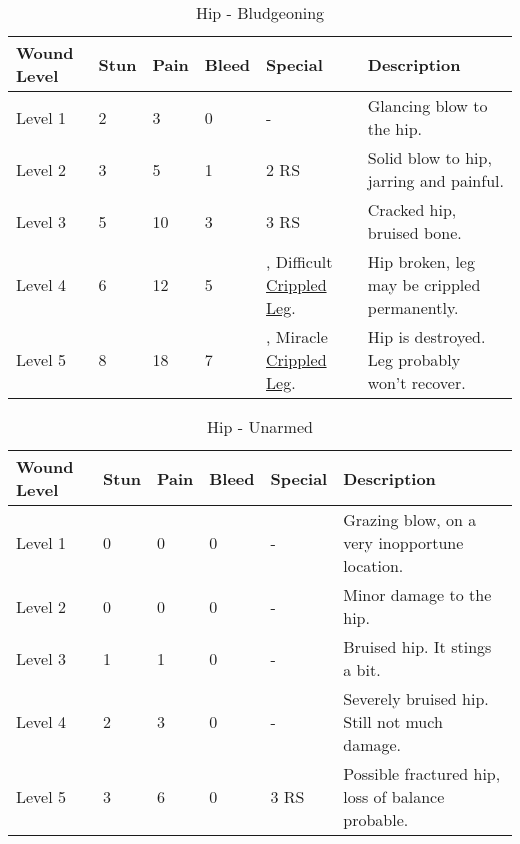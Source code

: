 \documentclass[oneside,11pt,english]{book}
\begin{document}
\begin{table}[hb] %
	\caption{Hip - Bludgeoning}
	\label{wound:Hip - Bludgeoning}
	\begin{tabu} to 
Wound Level &Stun &Pain &Bleed &Special &Description\\\toprule
Level 1& 2& 3& 0& - &Glancing blow to the hip.\\
Level 2& 3& 5& 1&  2 RS &Solid blow to hip, jarring and painful.\\
Level 3& 5& 10& 3&  3 RS &Cracked hip, bruised bone.\\
Level 4& 6& 12& 5
	&, \newline
		Difficult~ \hyperref[bane:Crippled Limb/Appendage]{Crippled Leg}.
	&Hip broken, leg may be crippled permanently.\\
Level 5& 8& 18& 7
	&, \newline
		Miracle~ \hyperref[bane:Crippled Limb/Appendage]{Crippled Leg}.
	&Hip is destroyed. Leg probably won’t recover.\\
	\end{tabu}
\end{table}

\begin{table}[!hb] %
	\caption{Hip - Unarmed}
	\label{wound:Hip - Unarmed}
	\begin{tabu} to 
Wound Level &Stun &Pain &Bleed &Special &Description\\\toprule
Level 1& 0& 0& 0& - &Grazing blow, on a very inopportune location.\\
Level 2& 0& 0& 0& - &Minor damage to the hip.\\
Level 3& 1& 1& 0& - &Bruised hip. It stings a bit.\\
Level 4& 2& 3& 0& - &Severely bruised hip. Still not much damage.\\
Level 5& 3& 6& 0&  3 RS &Possible fractured hip, loss of balance probable.\\
	\end{tabu}
\end{table}
	\clearpage
\end{document}
